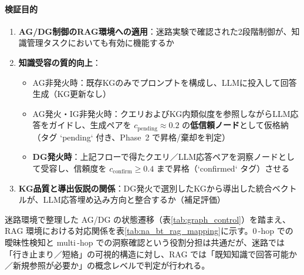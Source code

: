 \documentclass[ja=standard,xelatex]{bxjsarticle}
\begin{document}
\paragraph{検証目的}
\begin{enumerate}
  \item \textbf{AG/DG制御のRAG環境への適用}：迷路実験で確認された2段階制御が、知識管理タスクにおいても有効に機能するか

  \item \textbf{知識受容の質的向上}：
  \begin{itemize}
    \item AG非発火時：既存KGのみでプロンプトを構成し、LLMに投入して回答生成（KG更新なし）
    \item AG発火・IG非発火時：クエリおよびKG内類似度を参照しながらLLM応答をガイドし、生成ペアを $c_{\mathrm{pending}}\approx0.2$ の\textbf{低信頼ノード}として仮格納（タグ `pending` 付き、Phase~2 で昇格/棄却を判定）
    \item \textbf{DG発火時}：上記フローで得たクエリ／LLM応答ペアを洞察ノードとして受容し、信頼度を $c_{\mathrm{confirm}}\ge0.4$ まで昇格（`confirmed` タグ）させる
  \end{itemize}

  \item \textbf{KG品質と導出仮説の関係}：DG発火で選別したKGから導出した統合ベクトルが、LLM応答埋め込み方向と整合するか（補足評価）
\end{enumerate}

\noindent 迷路環境で整理した AG/DG の状態遷移（表\ref{tab:graph_control}）を踏まえ、RAG 環境における対応関係を表\ref{tab:na_bt_rag_mapping}に示す。0\,\mbox{-}hop での曖昧性検知と multi\,\mbox{-}hop での洞察確認という役割分担は共通だが、迷路では「行き止まり／短絡」の可視的構造に対し、RAG では「既知知識で回答可能か／新規参照が必要か」の概念レベルで判定が行われる。
\end{document}
